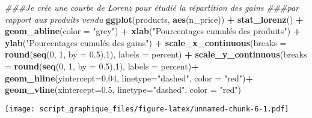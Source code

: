 \documentclass[
]{article}
\newenvironment{Shaded}{\begin{snugshade}}{\end{snugshade}}
\newcommand{\CommentTok}[1]{\textcolor[rgb]{0.56,0.35,0.01}{\textit{#1}}}
\newcommand{\DataTypeTok}[1]{\textcolor[rgb]{0.13,0.29,0.53}{#1}}
\newcommand{\DecValTok}[1]{\textcolor[rgb]{0.00,0.00,0.81}{#1}}
\newcommand{\FloatTok}[1]{\textcolor[rgb]{0.00,0.00,0.81}{#1}}
\newcommand{\KeywordTok}[1]{\textcolor[rgb]{0.13,0.29,0.53}{\textbf{#1}}}
\newcommand{\NormalTok}[1]{#1}
\newcommand{\OperatorTok}[1]{\textcolor[rgb]{0.81,0.36,0.00}{\textbf{#1}}}
\newcommand{\StringTok}[1]{\textcolor[rgb]{0.31,0.60,0.02}{#1}}
\begin{document}
\begin{Shaded}
\begin{Highlighting}[]
\CommentTok{###Je crée une courbe de Lorenz pour étudié la répartition des gains}
\CommentTok{###par rapport aux produits vendu}
\KeywordTok{ggplot}\NormalTok{(products, }\KeywordTok{aes}\NormalTok{(n_price)) }\OperatorTok{+}\StringTok{ }
\StringTok{  }\KeywordTok{stat_lorenz}\NormalTok{() }\OperatorTok{+}\StringTok{ }
\StringTok{  }\KeywordTok{geom_abline}\NormalTok{(}\DataTypeTok{color =} \StringTok{"grey"}\NormalTok{) }\OperatorTok{+}\StringTok{ }
\StringTok{  }\KeywordTok{xlab}\NormalTok{(}\StringTok{"Pourcentages cumulés des produits"}\NormalTok{) }\OperatorTok{+}
\StringTok{  }\KeywordTok{ylab}\NormalTok{(}\StringTok{"Pourcentages cumulés des gains"}\NormalTok{) }\OperatorTok{+}
\StringTok{  }\KeywordTok{scale_x_continuous}\NormalTok{(}\DataTypeTok{breaks =} \KeywordTok{round}\NormalTok{(}\KeywordTok{seq}\NormalTok{(}\DecValTok{0}\NormalTok{, }\DecValTok{1}\NormalTok{, }\DataTypeTok{by =} \FloatTok{0.5}\NormalTok{),}\DecValTok{1}\NormalTok{),}
                     \DataTypeTok{labels =}\NormalTok{ percent) }\OperatorTok{+}
\StringTok{  }\KeywordTok{scale_y_continuous}\NormalTok{(}\DataTypeTok{breaks =} \KeywordTok{round}\NormalTok{(}\KeywordTok{seq}\NormalTok{(}\DecValTok{0}\NormalTok{, }\DecValTok{1}\NormalTok{, }\DataTypeTok{by =} \FloatTok{0.5}\NormalTok{),}\DecValTok{1}\NormalTok{),}
                     \DataTypeTok{labels =}\NormalTok{ percent)}\OperatorTok{+}\StringTok{ }
\StringTok{  }\KeywordTok{geom_hline}\NormalTok{(}\DataTypeTok{yintercept=}\FloatTok{0.04}\NormalTok{, }\DataTypeTok{linetype=}\StringTok{"dashed"}\NormalTok{, }\DataTypeTok{color =} \StringTok{"red"}\NormalTok{)}\OperatorTok{+}
\StringTok{  }\KeywordTok{geom_vline}\NormalTok{(}\DataTypeTok{xintercept=}\FloatTok{0.5}\NormalTok{, }\DataTypeTok{linetype=}\StringTok{"dashed"}\NormalTok{, }\DataTypeTok{color =} \StringTok{"red"}\NormalTok{)}
\end{Highlighting}
\end{Shaded}

\texttt{[image: script\_graphique\_files/figure-latex/unnamed-chunk-6-1.pdf]}

\begin{Shaded}
\end{Shaded}
\end{document}

